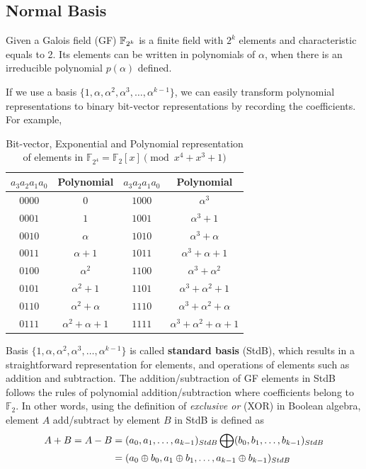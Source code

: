 \subsection{Normal Basis}
Given a Galois field (GF) ${\mathbb{F}}_{2^k}$ is a finite field with  $2^k$ elements and characteristic equals to 2.
Its elements can be written in polynomials of $\alpha$, when there is an irreducible polynomial $p(\alpha)$
defined.

If we use a basis $\{1,\alpha,\alpha^2,\alpha^3,\dots,\alpha^{k-1}\}$, we can easily transform polynomial representations
to binary bit-vector representations by recording the coefficients. For example,

\begin{table}[H]
\centering
\caption{Bit-vector, Exponential and Polynomial representation of
elements in  ${\mathbb{F}}_{2^4} = {\mathbb{F}}_2[x]
\pmod{x^4+x^3+1}$}
\begin{tabular}{|c|c||c|c|} 
\hline
$a_3a_2a_1a_0$ & Polynomial     &$a_3a_2a_1a_0$ & Polynomial  \\
\hline
$0000$        & $0$           & $1000$  &$\alpha^3$\\
\hline
$0001$        & $1$           & $1001$  & $\alpha^3 + 1$\\
\hline
$0010$        &  $\alpha$       & $1010$ & $\alpha^3 + \alpha$  \\
\hline
$0011$        &  $\alpha + 1$   & $1011$ &  $\alpha^3+\alpha+1$\\
\hline
$0100$        &  $\alpha^2$     &  $1100$ &  $\alpha^3 + \alpha^2$\\
\hline
$0101$        & $\alpha^2 + 1$ & $1101$  & $\alpha^3+\alpha^2+1$\\
\hline
$0110$        &  $\alpha^2 + \alpha$ & $1110$ &  $\alpha^3+\alpha^2+\alpha$\\
\hline
$0111$        & $\alpha^2+\alpha+1$ & $1111$ & $\alpha^3+\alpha^2+\alpha+1$\\
\hline
\end{tabular}
\label{table:booltogalois}  
\end{table}

Basis $\{1,\alpha,\alpha^2,\alpha^3,\dots,\alpha^{k-1}\}$ is called {\bf standard basis} (StdB), which results in
a straightforward representation for elements, and operations of elements such as addition and subtraction.
The addition/subtraction of GF elements in StdB follows the rules of polynomial addition/subtraction
where coefficients belong to $\mathbb F_2$. In other words, using the definition of {\it exclusive or} (XOR) in
Boolean algebra, element $A$ add/subtract by element $B$ in StdB is defined as
\begin{align}\label{eqn:StdB}
A+B = A-B &= (a_0,a_1,\dots,a_{k-1})_{StdB} \bigoplus (b_0,b_1,\dots,b_{k-1})_{StdB} \nonumber\\
&=(a_0\oplus b_0, a_1\oplus b_1,\dots,a_{k-1}\oplus b_{k-1})_{StdB} 
\end{align}

